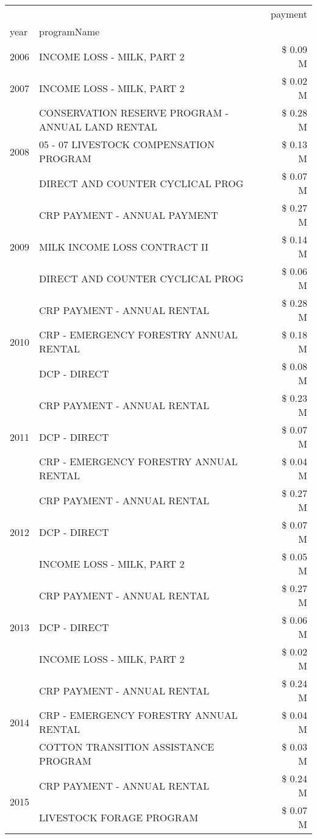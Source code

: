 \begin{tabular}{llr}
\toprule
 &  & payment \\
year & programName &  \\
\midrule
2006 & INCOME LOSS - MILK, PART 2 & \$ 0.09 M \\
\cline{1-3}
2007 & INCOME LOSS - MILK, PART 2 & \$ 0.02 M \\
\cline{1-3}
\multirow[t]{3}{*}{2008} & CONSERVATION RESERVE PROGRAM - ANNUAL LAND RENTAL & \$ 0.28 M \\
 & 05 - 07 LIVESTOCK COMPENSATION PROGRAM & \$ 0.13 M \\
 & DIRECT AND COUNTER CYCLICAL PROG & \$ 0.07 M \\
\cline{1-3}
\multirow[t]{3}{*}{2009} & CRP PAYMENT - ANNUAL PAYMENT & \$ 0.27 M \\
 & MILK INCOME LOSS CONTRACT II & \$ 0.14 M \\
 & DIRECT AND COUNTER CYCLICAL PROG & \$ 0.06 M \\
\cline{1-3}
\multirow[t]{3}{*}{2010} & CRP PAYMENT - ANNUAL RENTAL & \$ 0.28 M \\
 & CRP - EMERGENCY FORESTRY ANNUAL RENTAL & \$ 0.18 M \\
 & DCP - DIRECT & \$ 0.08 M \\
\cline{1-3}
\multirow[t]{3}{*}{2011} & CRP PAYMENT - ANNUAL RENTAL & \$ 0.23 M \\
 & DCP - DIRECT & \$ 0.07 M \\
 & CRP - EMERGENCY FORESTRY ANNUAL RENTAL & \$ 0.04 M \\
\cline{1-3}
\multirow[t]{3}{*}{2012} & CRP PAYMENT - ANNUAL RENTAL & \$ 0.27 M \\
 & DCP - DIRECT & \$ 0.07 M \\
 & INCOME LOSS - MILK, PART 2 & \$ 0.05 M \\
\cline{1-3}
\multirow[t]{3}{*}{2013} & CRP PAYMENT - ANNUAL RENTAL & \$ 0.27 M \\
 & DCP - DIRECT & \$ 0.06 M \\
 & INCOME LOSS - MILK, PART 2 & \$ 0.02 M \\
\cline{1-3}
\multirow[t]{3}{*}{2014} & CRP PAYMENT - ANNUAL RENTAL & \$ 0.24 M \\
 & CRP - EMERGENCY FORESTRY ANNUAL RENTAL & \$ 0.04 M \\
 & COTTON TRANSITION ASSISTANCE PROGRAM & \$ 0.03 M \\
\cline{1-3}
\multirow[t]{3}{*}{2015} & CRP PAYMENT - ANNUAL RENTAL & \$ 0.24 M \\
 & LIVESTOCK FORAGE PROGRAM & \$ 0.07 M \\

\end{tabular}
